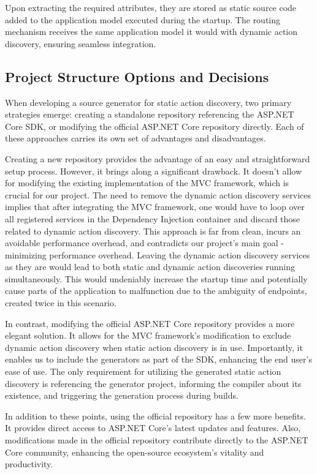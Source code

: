 Upon extracting the required attributes, they are stored as static source code added to the application model executed during the startup. The routing mechanism receives the same application model it would with dynamic action discovery, ensuring seamless integration.

\subsection{Project Structure Options and Decisions}

When developing a source generator for static action discovery, two primary strategies emerge: creating a standalone repository referencing the ASP.NET Core SDK, or modifying the official ASP.NET Core repository directly. Each of these approaches carries its own set of advantages and disadvantages.

Creating a new repository provides the advantage of an easy and straightforward setup process. However, it brings along a significant drawback. It doesn't allow for modifying the existing implementation of the MVC framework, which is crucial for our project. The need to remove the dynamic action discovery services implies that after integrating the MVC framework, one would have to loop over all registered services in the Dependency Injection container and discard those related to dynamic action discovery. This approach is far from clean, incurs an avoidable performance overhead, and contradicts our project's main goal - minimizing performance overhead. Leaving the dynamic action discovery services as they are would lead to both static and dynamic action discoveries running simultaneously. This would undeniably increase the startup time and potentially cause parts of the application to malfunction due to the ambiguity of endpoints, created twice in this scenario.

In contrast, modifying the official ASP.NET Core repository provides a more elegant solution. It allows for the MVC framework's modification to exclude dynamic action discovery when static action discovery is in use. Importantly, it enables us to include the generators as part of the SDK, enhancing the end user's ease of use. The only requirement for utilizing the generated static action discovery is referencing the generator project, informing the compiler about its existence, and triggering the generation process during builds.

In addition to these points, using the official repository has a few more benefits. It provides direct access to ASP.NET Core's latest updates and features. Also, modifications made in the official repository contribute directly to the ASP.NET Core community, enhancing the open-source ecosystem's vitality and productivity.


